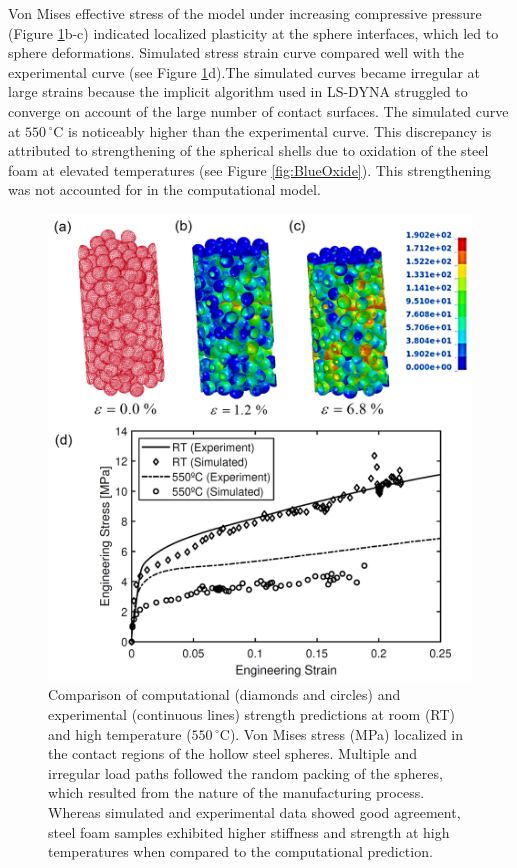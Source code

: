 \documentclass[review]{elsarticle}
\begin{document}
{Von Mises effective stress of the model under increasing compressive pressure (Figure \ref{Figure5}b-c) indicated localized plasticity at the sphere interfaces, which led to sphere deformations. Simulated stress strain curve compared well with the experimental curve (see Figure \ref{Figure5}d).The simulated curves became irregular at large strains because the implicit algorithm used in LS-DYNA struggled to converge on account of the large number of contact surfaces. The simulated curve at $550\,^{\circ}\mathrm{C}$ is noticeably higher than the experimental curve. This discrepancy is attributed to strengthening of the spherical shells due to oxidation of the steel foam at elevated temperatures (see Figure \ref{fig:BlueOxide}). This strengthening was not accounted for in the computational model.


\begin{figure}[htbp]
	\begin{center}
		\includegraphics[width=0.75\linewidth]
		{Tex-Figures/Fig10-SimulatedCompression}
		\caption{Comparison of computational (diamonds and circles) and experimental (continuous lines) strength predictions at room (RT) and high temperature ($550\,^{\circ}\mathrm{C}$). Von Mises stress (MPa) localized in the contact regions of the hollow steel spheres. Multiple and irregular load paths followed the random packing of the spheres, which resulted from the nature of the manufacturing process. Whereas simulated and experimental data showed good agreement, steel foam samples exhibited higher stiffness and strength at high temperatures when compared to the computational prediction.}
		\label{Figure5}
	\end{center}
\end{figure}


}
\end{document}
